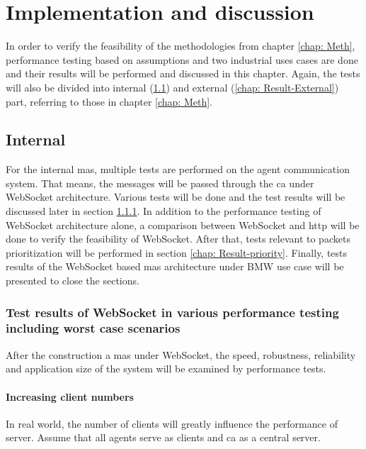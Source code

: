 \chapter{Implementation and discussion} \label{chap: Result}

In order to verify the feasibility of the methodologies from chapter \ref{chap: Meth}, 
performance testing based on assumptions and two industrial uses cases 
are done and their results will be performed and discussed in this chapter. 
Again, the tests will also be divided into internal (\ref{chap: Result-Internal}) 
and external (\ref{chap: Result-External}) part, referring to those in chapter \ref{chap: Meth}.

\section{Internal}\label{chap: Result-Internal}
For the internal \gls{mas}, multiple tests are performed on the agent 
communication system. That means, the messages 
will be passed through the \gls{ca} under WebSocket architecture. 
Various tests will be done and the test results will be discussed later in section 
\ref{chap: Result-WS}. 
In addition to the performance testing of WebSocket architecture alone, 
a comparison between WebSocket and \gls{http} will be done to verify the feasibility 
of WebSocket. 
After that, tests relevant to packets prioritization will be performed in 
section \ref{chap: Result-priority}. 
Finally, tests results of the WebSocket based \gls{mas} architecture under 
BMW use case will be presented to close the sections.


\subsection{Test results of WebSocket in various performance testing including worst case scenarios} \label{chap: Result-WS}

After the construction a \gls{mas} under WebSocket, the speed, robustness, 
reliability and application size of the system will be examined by 
performance tests. 

\subsubsection{Increasing client numbers}
In real world, the number of clients will greatly influence the performance of 
server. Assume that all agents serve as clients and \gls{ca} as a central server. 
  

